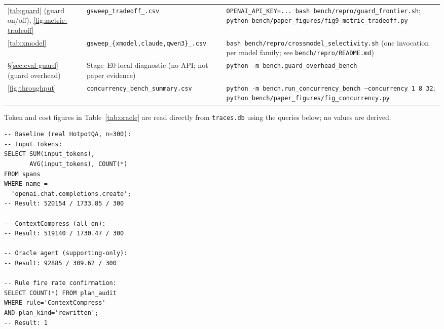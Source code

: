 \begin{table}[t]
\begin{tabularx}{\linewidth}{p{1.7cm} >{\raggedright\arraybackslash}X >{\raggedright\arraybackslash}X}
\addlinespace
\ref{tab:guard} (guard on/off), \ref{fig:metric-tradeoff} &
\texttt{gsweep\_\allowbreak tradeoff\_\allowbreak *.csv} &
\texttt{OPENAI\_\allowbreak API\_\allowbreak KEY=...\ bash bench/repro/guard\_\allowbreak frontier.sh};
\texttt{python bench/paper\_\allowbreak figures/fig9\_\allowbreak metric\_\allowbreak tradeoff.py} \\

\addlinespace
\ref{tab:xmodel} &
\texttt{gsweep\_\allowbreak \{xmodel,claude,qwen3\}\_\allowbreak *.csv} &
\texttt{bash bench/repro/crossmodel\_\allowbreak selectivity.sh} (one invocation per model family; see \texttt{bench/repro/README.md}) \\

\addlinespace
\S\ref{sec:eval-guard} (guard overhead) &
Stage~E0 local diagnostic (no API; not paper evidence) &
\texttt{python -m bench.guard\_\allowbreak overhead\_\allowbreak bench} \\

\addlinespace
\ref{fig:throughput} &
\texttt{concurrency\_\allowbreak bench\_\allowbreak summary.csv} &
\texttt{python -m bench.run\_\allowbreak concurrency\_\allowbreak bench --concurrency 1 8 32};
\texttt{python bench/paper\_\allowbreak figures/fig\_\allowbreak concurrency.py} \\

\bottomrule
\end{tabularx}
\end{table}

Token and cost figures in Table~\ref{tab:oracle} are read directly from
\texttt{traces.db} using the queries below; no values are derived.

\begin{verbatim}
-- Baseline (real HotpotQA, n=300):
-- Input tokens:
SELECT SUM(input_tokens),
       AVG(input_tokens), COUNT(*)
FROM spans
WHERE name =
  'openai.chat.completions.create';
-- Result: 520154 / 1733.85 / 300

-- ContextCompress (all-on):
-- Result: 519140 / 1730.47 / 300

-- Oracle agent (supporting-only):
-- Result: 92885 / 309.62 / 300

-- Rule fire rate confirmation:
SELECT COUNT(*) FROM plan_audit
WHERE rule='ContextCompress'
AND plan_kind='rewritten';
-- Result: 1
\end{verbatim}


